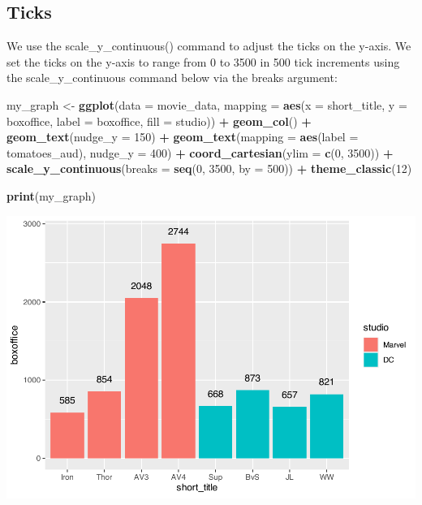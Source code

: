 \documentclass[
]{krantz}
\makeatletter
\newenvironment{Shaded}{\begin{snugshade}}{\end{snugshade}}
\newcommand{\DataTypeTok}[1]{\textcolor[rgb]{0.27,0.27,0.27}{#1}}
\newcommand{\DecValTok}[1]{\textcolor[rgb]{0.06,0.06,0.06}{#1}}
\newcommand{\KeywordTok}[1]{\textcolor[rgb]{0.27,0.27,0.27}{\textbf{#1}}}
\newcommand{\NormalTok}[1]{#1}
\newcommand{\OperatorTok}[1]{\textcolor[rgb]{0.43,0.43,0.43}{\textbf{#1}}}
\newcommand{\StringTok}[1]{\textcolor[rgb]{0.5,0.5,0.5}{#1}}
\newenvironment{kframe}{%
\medskip{}
\setlength{\fboxsep}{.8em}
 \def\at@end@of@kframe{}%
 \ifinner\ifhmode%
  \def\at@end@of@kframe{\end{minipage}}%
  \begin{minipage}{\columnwidth}%
 \fi\fi%
 \def\FrameCommand##1{\hskip\@totalleftmargin \hskip-\fboxsep
 \colorbox{shadecolor}{##1}\hskip-\fboxsep
     \hskip-\linewidth \hskip-\@totalleftmargin \hskip\columnwidth}%
 \MakeFramed {\advance\hsize-\width
   \@totalleftmargin\z@ \linewidth\hsize
   \@setminipage}}%
 {\par\unskip\endMakeFramed%
 \at@end@of@kframe}
\renewenvironment{Shaded}{\begin{kframe}}{\end{kframe}}
\makeatother
\begin{document}
\hypertarget{ticks}{%
\subsection{Ticks}\label{ticks}}

We use the scale\_y\_continuous() command to adjust the ticks on the y-axis. We set the ticks on the y-axis to range from 0 to 3500 in 500 tick increments using the scale\_y\_continuous command below via the breaks argument:

\begin{Shaded}
\begin{Highlighting}[]
\NormalTok{my_graph <-}\StringTok{ }\KeywordTok{ggplot}\NormalTok{(}\DataTypeTok{data =}\NormalTok{ movie_data,}
           \DataTypeTok{mapping =} \KeywordTok{aes}\NormalTok{(}\DataTypeTok{x =}\NormalTok{ short_title,}
                         \DataTypeTok{y =}\NormalTok{ boxoffice,}
                         \DataTypeTok{label =}\NormalTok{ boxoffice, }
                         \DataTypeTok{fill =}\NormalTok{ studio)) }\OperatorTok{+}
\StringTok{  }\KeywordTok{geom_col}\NormalTok{() }\OperatorTok{+}
\StringTok{  }\KeywordTok{geom_text}\NormalTok{(}\DataTypeTok{nudge_y =} \DecValTok{150}\NormalTok{)  }\OperatorTok{+}
\StringTok{  }\KeywordTok{geom_text}\NormalTok{(}\DataTypeTok{mapping =} \KeywordTok{aes}\NormalTok{(}\DataTypeTok{label =}\NormalTok{ tomatoes_aud), }
            \DataTypeTok{nudge_y =} \DecValTok{400}\NormalTok{) }\OperatorTok{+}
\StringTok{  }\KeywordTok{coord_cartesian}\NormalTok{(}\DataTypeTok{ylim =} \KeywordTok{c}\NormalTok{(}\DecValTok{0}\NormalTok{, }\DecValTok{3500}\NormalTok{)) }\OperatorTok{+}
\StringTok{  }\KeywordTok{scale_y_continuous}\NormalTok{(}\DataTypeTok{breaks =} \KeywordTok{seq}\NormalTok{(}\DecValTok{0}\NormalTok{, }\DecValTok{3500}\NormalTok{, }\DataTypeTok{by =} \DecValTok{500}\NormalTok{)) }\OperatorTok{+}
\StringTok{  }\KeywordTok{theme_classic}\NormalTok{(}\DecValTok{12}\NormalTok{)}

\KeywordTok{print}\NormalTok{(my_graph)}
\end{Highlighting}
\end{Shaded}

\includegraphics[width=0.65\linewidth]{bookdown_files/figure-latex/unnamed-chunk-118-1}
\end{document}
